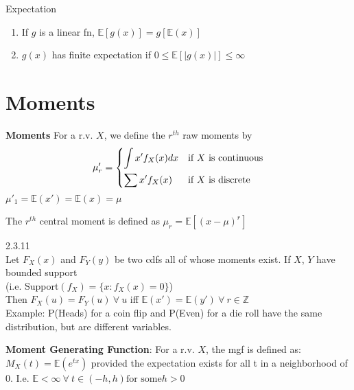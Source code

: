 \documentclass[14pt, oneside, letterpaper]{notes}
\begin{document}
\begin{remark} Expectation
	\begin{enumerate}
	\item If $g$ is a linear fn, $\mathbb{E}[g(x)] =
	g[\mathbb{E}(x)]$
	\item $g(x)$ has finite expectation if
	$0 \leq \mathbb{E}[\left| g(x) \right|] \le \infty $
	\end{enumerate}
\end{remark}


\section*{Moments}
\begin{mydef}
	\textbf{Moments} For a r.v. $X$, we define the $r^{th}$
	raw moments by 
	\[ 
		\mu'_r = 
		\begin{dcases}
			\int x'f_X(x)dx 
			& \text{if $X$ is continuous} \\			
			\sum x'f_X(x)
			& \text{if $X$ is discrete}
		\end{dcases}
	\]
	$\mu'_1 = \mathbb{E}(x') = \mathbb{E}(x) = \mu$
\end{mydef}

\begin{mydef}
	The $r^{th}$ central moment is defined as 
	$\mu_r = \mathbb{E}[(x-\mu)^r] $
\end{mydef}

\begin{theorem} 2.3.11 \\
Let $F_X(x)$ and $F_Y(y)$ be two cdfs all of whose moments
exist.  If $X$, $Y$ have bounded support \\
(i.e. Support$(f_X) = \{x: f_X(x)=0 \}$) \\
Then $F_X(u) = F_Y(u) \: \forall \: u$ iff $\mathbb{E}(x')
= \mathbb{E}(y') \: \forall \: r \in \mathbb{Z}$ \\
Example: P(Heads) for a coin flip and P(Even) for a die
roll have the same distribution, but are different variables.
\end{theorem}

\begin{mydef}
\textbf{Moment Generating Function}: For a r.v. $X$,
the mgf is defined as: $M_X(t) = \mathbb{E}(e^{tx})$ 
provided the expectation exists for all t in a neighborhood
of 0.  I.e. $\mathbb{E} < \infty \: \forall \: t \in
(-h,h) \text{for some} h>0$
\end{mydef}
\end{document}

